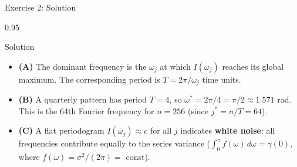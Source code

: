 \documentclass[9pt, aspectratio=169, t]{beamer}
\begin{document}
\begin{frame}{Exercise 2: Solution}
    \begin{cminipage}{0.95\textwidth}
    \begin{exampleblock}{Solution}
        {\small
        \begin{itemize}\setlength{\itemsep}{3pt}
            \item \textcolor{MainBlue}{\textbf{(A)}} The dominant frequency is the $\omega_j$ at which $I(\omega_j)$ reaches its global maximum. The corresponding period is $T = 2\pi / \omega_j$ time units.
            \item \textcolor{MainBlue}{\textbf{(B)}} A quarterly pattern has period $T = 4$, so $\omega^* = 2\pi/4 = \pi/2 \approx 1.571$ rad. This is the 64th Fourier frequency for $n = 256$ (since $j^* = n/T = 64$).
            \item \textcolor{MainBlue}{\textbf{(C)}} A flat periodogram $I(\omega_j) \approx c$ for all $j$ indicates \textbf{white noise}: all frequencies contribute equally to the series variance ($\int_0^\pi f(\omega)\,d\omega = \gamma(0)$, where $f(\omega) = \sigma^2/(2\pi) = $ const).
        \end{itemize}
        }
    \end{exampleblock}
    \end{cminipage}
\end{frame}
\end{document}

